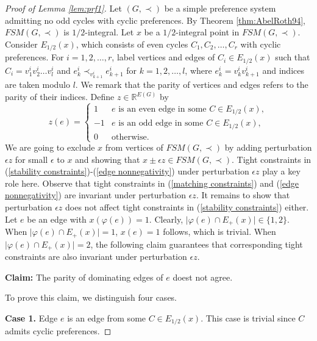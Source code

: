 \documentclass[11pt]{article}
\numberwithin{theorem}{section}
\begin{document}
\begin{proof}[Proof of Lemma \ref{lem:prf1}]
Let $(G,\prec)$ be a simple preference system admitting no odd cycles with cyclic preferences.
By Theorem \ref{thm:AbelRoth94}, $FSM(G,\prec)$ is $1/2$-integral.
Let $x$ be a $1/2$-integral point in $FSM(G, \prec)$.
Consider $E_{1/2}(x)$, which consists of even cycles $C_1,C_2,\ldots,C_r$ with cyclic preferences. For $i=1,2,\ldots,r$, label vertices and edges of $C_i\in E_{1/2}(x)$ such that $C_i=v^i_1v^i_2\ldots v^i_{l}$ and $e^i_k\prec_{v^i_{k+1}} e^i_{k+1}$ for $k=1,2,\ldots,l$, where $e^i_k=v^i_{k}v^i_{k+1}$ and indices are taken modulo $l$. 
We remark that the parity of vertices and edges refers to the parity of their indices. Define $z\in \mathbb{R}^{E(G)}$ by
\begin{equation*}
z(e)=
\begin{cases}
1 & e\text{ is an even edge in some }C \in E_{1/2}(x),\\
-1 & e\text{ is an odd edge in some }C \in E_{1/2}(x),\\
0 & \text{otherwise}.
\end{cases}
\end{equation*}
We are going to exclude $x$ from vertices of $FSM(G, \prec)$ by adding perturbation $\epsilon z$ for small $\epsilon$ to $x$ and showing that $x\pm\epsilon z\in FSM(G,\prec)$. 
Tight constraints in (\ref{stability constraints})-(\ref{edge nonnegativity}) under perturbation $\epsilon z$ play a key role here. Observe that tight constraints in (\ref{matching constraints}) and (\ref{edge nonnegativity}) are invariant under perturbation $\epsilon z$. It remains to show that perturbation $\epsilon z$ does not affect tight constraints in (\ref{stability constraints}) either. Let $e$ be an edge with $x(\varphi(e))=1$. Clearly, $\lvert \varphi(e)\cap E_+(x)\rvert \in\{1,2\}$. When $\lvert \varphi(e)\cap E_+(x)\rvert=1$, $x(e)=1$ follows, which is trivial. When $\lvert \varphi(e)\cap E_+(x)\rvert =2$, the following claim guarantees that corresponding tight constraints are also invariant under perturbation $\epsilon z$.

\textbf{Claim:} The parity of dominating edges of $e$ doest not agree.

To prove this claim, we distinguish four cases.

\textbf{Case 1.} Edge $e$ is an edge from some $C\in E_{1/2}(x)$. This case is trivial since $C$ admits cyclic preferences.


\end{proof}
\end{document}
